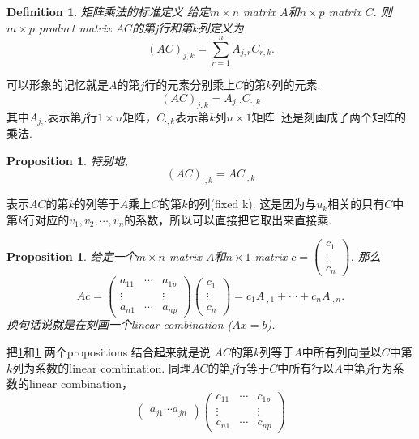 \documentclass{article}
\newtheorem{proposition}[theorem]{Proposition}
\newtheorem{definition}[theorem]{Definition}
\begin{document}
\begin{definition}
\rm {\color{red} 矩阵乘法的标准定义} 给定$ m \times n$ matrix $A$和$n \times p$ matrix $C$. 则$m \times p$ product matrix $AC$的第j行和第$k$列定义为
$$
(AC)_{j,k} =  \sum\limits_{r=1}^{n}A_{j,r}C_{r,k} .
$$
\end{definition}

{\color{blue} 可以形象的记忆就是$A$的第$j$行的元素分别乘上$C$的第$k$列的元素}.
$$
(AC)_{j,k}=A_{j,\cdot}C_{\cdot,k}
$$
其中$A_{j,\cdot}$表示第$j$行$1 \times n$矩阵，$C_{\cdot,k}$表示第$k$列$n \times 1$矩阵. 还是刻画成了两个矩阵的乘法.

\begin{proposition} \label{matrix: one-column-1}
特别地,
$$
(AC)_{\cdot,k}=AC_{\cdot,k}
$$
\end{proposition}
表示$AC$的第$k$的列等于$A$乘上$C$的第$k$的列(fixed k). {\color{blue} 这是因为与$u_k$相关的只有$C$中第$k$行对应的$v_1,v_2,\cdots,v_n$的系数，所以可以直接把它取出来直接乘}.

\begin{proposition} \label{matrix: one-column-2}
\rm 给定一个$m \times n$ matrix $A$和$n \times 1$ matrix $c = \begin{pmatrix} c_1 \\ \vdots \\ c_n \end{pmatrix}$. 那么
$$
Ac =
\begin{pmatrix}
a_{11} & \cdots & a_{1p} \\
\vdots & & \vdots \\ 
a_{n1} & \cdots & a_{np}
\end{pmatrix} 
\begin{pmatrix}
c_1 \\ 
\vdots \\ 
c_n
\end{pmatrix}
= c_1A_{\cdot,1} + \cdots + c_nA_{\cdot,n}.
$$
换句话说就是在刻画一个linear combination ($Ax = b$).
\end{proposition}

把\ref{matrix: one-column-1}和\ref{matrix: one-column-2} 两个propositions 结合起来就是说{\color{red} $AC$的第$k$列等于$A$中所有列向量以$C$中第$k$列为系数的linear combination}. {\color{blue}同理$AC$的第$j$行等于$C$中所有行以$A$中第$j$行为系数的linear combination}，
$$
\begin{pmatrix}
a_{j1} \cdots a_{jn}
\end{pmatrix}
\begin{pmatrix}
c_{11} & \cdots & c_{1p} \\
\vdots & & \vdots \\ 
c_{n1} & \cdots & c_{np}
\end{pmatrix}
$$
\end{document}
